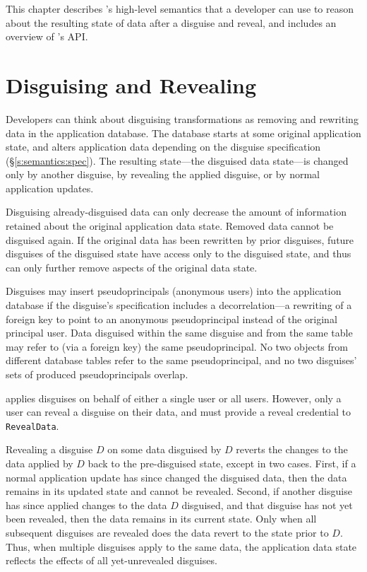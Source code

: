 This chapter describes \sys's high-level semantics that a developer can use to
reason about the resulting state of data after a disguise and reveal, and 
includes an overview of \sys's API.

\section{Disguising and Revealing}
\label{s:semantics:hl}
Developers can think about disguising transformations as removing and rewriting
data in the application database.
%
The database starts at some original application state, and alters application
data depending on the disguise specification (\S\ref{s:semantics:spec}).  The resulting
state---the disguised data state---is changed only by another disguise, by
revealing the applied disguise, or by normal application updates.
%

%
Disguising already-disguised data can only decrease the amount of information
retained about the original application data state. Removed data cannot be
disguised again. If the original data has been rewritten by prior disguises,
future disguises of the disguised state have access only to the disguised state,
and thus can only further remove aspects of the original data state.
%

Disguises may insert pseudoprincipals (anonymous users) into the application
database if the disguise's specification includes a decorrelation---a rewriting
of a foreign key to point to an anonymous pseudoprincipal instead of the
original principal user. Data disguised within the same disguise and from the
same table may refer to (via a foreign key) the same pseudoprincipal.
%
No two objects from different database tables refer to the same pseudoprincipal,
and no two disguises' sets of produced pseudoprincipals overlap.

%
\sys applies disguises on behalf of either a single user or all users. However,
only a user can reveal a disguise on their data, and must provide a reveal
credential to \texttt{RevealData}.
%

%
Revealing a disguise $D$ on some data disguised by $D$ reverts the changes to
the data applied by $D$ back to the pre-disguised state, except in two cases.
First, if a normal application update has since changed the disguised data, then
the data remains in its updated state and cannot be revealed.
%
Second, if another disguise has since applied changes to the data $D$ disguised,
and that disguise has not yet been revealed, then the data remains in its
current state.
%
Only when all subsequent disguises are revealed does the data revert to the
state prior to $D$.
%
Thus, when multiple disguises apply to the same data, the application data state
reflects the effects of all yet-unrevealed disguises.
%

